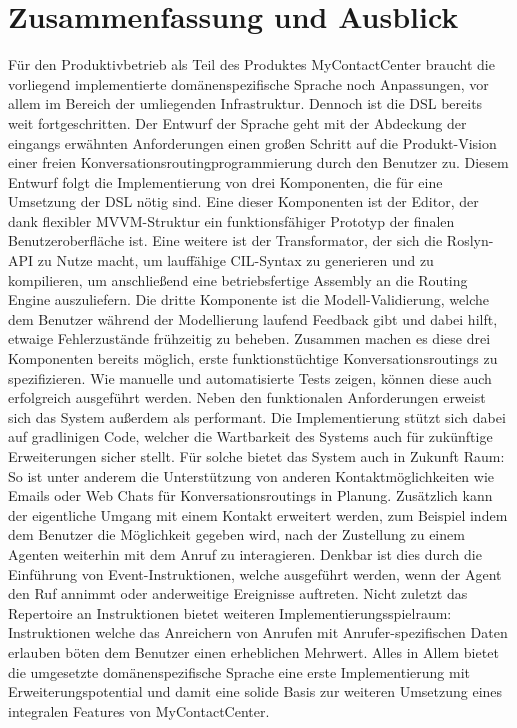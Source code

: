\chapter{Zusammenfassung und Ausblick}
Für den Produktivbetrieb als Teil des Produktes MyContactCenter braucht die vorliegend implementierte domänenspezifische Sprache noch Anpassungen, vor allem im Bereich der umliegenden Infrastruktur. 
Dennoch ist die DSL bereits weit fortgeschritten. Der Entwurf der Sprache geht mit der Abdeckung der eingangs erwähnten Anforderungen einen großen Schritt auf die Produkt-Vision einer freien Konversationsroutingprogrammierung durch den Benutzer zu. Diesem Entwurf folgt die Implementierung von drei Komponenten, die für eine Umsetzung der DSL nötig sind. Eine dieser Komponenten ist der Editor, der dank flexibler MVVM-Struktur ein funktionsfähiger Prototyp der finalen Benutzeroberfläche ist. Eine weitere ist der Transformator, der sich die Roslyn-API zu Nutze macht, um lauffähige CIL-Syntax zu generieren und zu kompilieren, um anschließend eine betriebsfertige Assembly an die Routing Engine auszuliefern. Die dritte Komponente ist die  Modell-Validierung, welche dem Benutzer während der Modellierung laufend Feedback gibt und dabei hilft, etwaige Fehlerzustände frühzeitig zu beheben. 
\newline
Zusammen machen es diese drei Komponenten bereits möglich, erste funktionstüchtige Konversationsroutings zu spezifizieren. Wie manuelle und automatisierte Tests zeigen, können diese auch erfolgreich ausgeführt werden. Neben den funktionalen Anforderungen erweist sich das System außerdem als performant. Die Implementierung stützt sich dabei auf gradlinigen Code, welcher die Wartbarkeit des Systems auch für zukünftige Erweiterungen sicher stellt. 
\newline
Für solche bietet das System auch in Zukunft Raum: So ist unter anderem die Unterstützung von anderen Kontaktmöglichkeiten wie Emails oder Web Chats für Konversationsroutings in Planung. Zusätzlich kann der eigentliche Umgang mit einem Kontakt erweitert werden, zum Beispiel indem dem Benutzer die Möglichkeit gegeben wird, nach der Zustellung zu einem Agenten weiterhin mit dem Anruf zu interagieren. Denkbar ist dies durch die Einführung von Event-Instruktionen, welche ausgeführt werden, wenn der Agent den Ruf annimmt oder anderweitige Ereignisse auftreten. Nicht zuletzt das Repertoire an Instruktionen bietet weiteren Implementierungsspielraum: Instruktionen welche das Anreichern von Anrufen mit Anrufer-spezifischen Daten erlauben böten dem Benutzer einen erheblichen Mehrwert. Alles in Allem bietet die umgesetzte domänenspezifische Sprache eine erste Implementierung mit Erweiterungspotential und damit eine solide Basis zur weiteren 
Umsetzung eines integralen Features von MyContactCenter.